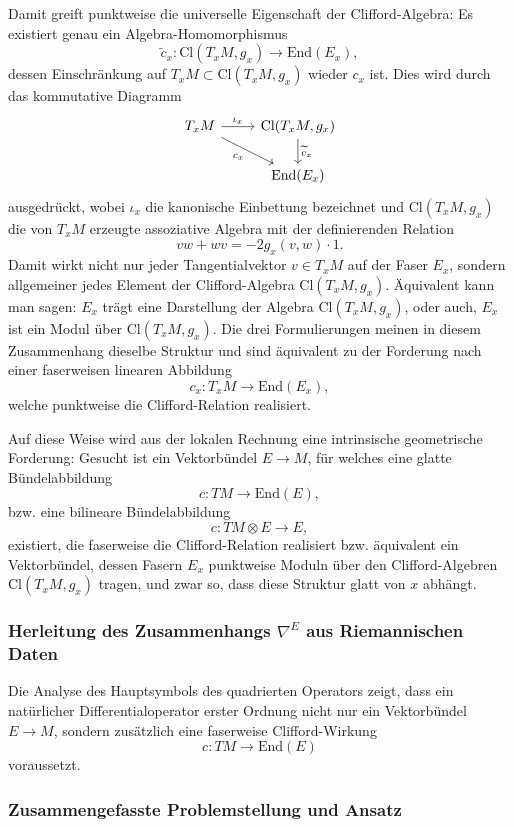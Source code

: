 \documentclass[10pt, letterpaper]{article}
\newcommand{\End}{\mathrm{End}}
\newcommand{\Cl}{\mathrm{Cl}}
\begin{document}
Damit greift punktweise die universelle Eigenschaft der Clifford-Algebra: Es existiert genau ein Algebra-Homomorphismus
\[
\widetilde c_x:\Cl(T_xM,g_x)\longrightarrow \End(E_x),
\]
dessen Einschränkung auf \(T_xM\subset \Cl(T_xM,g_x)\) wieder \(c_x\) ist. Dies wird durch das kommutative Diagramm
\[
\begin{tikzcd}
T_xM \arrow[r,"\iota_x"] \arrow[dr,"c_x"'] & \Cl(T_xM,g_x) \arrow[d,"\widetilde c_x"] \\
& \End(E_x)
\end{tikzcd}
\]
ausgedrückt, wobei \(\iota_x\) die kanonische Einbettung bezeichnet und $\Cl(T_xM,g_x)$ die von \(T_xM\) erzeugte assoziative Algebra mit der definierenden Relation
\[
vw+w v=-2g_x(v,w)\cdot 1.
\]
Damit wirkt nicht nur jeder Tangentialvektor \(v\in T_xM\) auf der Faser \(E_x\), sondern allgemeiner jedes Element der Clifford-Algebra \(\Cl(T_xM,g_x)\). Äquivalent kann man sagen: \(E_x\) trägt eine Darstellung der Algebra \(\Cl(T_xM,g_x)\), oder auch, \(E_x\) ist ein Modul über \(\Cl(T_xM,g_x)\). Die drei Formulierungen meinen in diesem Zusammenhang dieselbe Struktur und sind äquivalent zu der Forderung nach einer faserweisen linearen Abbildung
\[
c_x:T_xM\longrightarrow \End(E_x),
\]
welche punktweise die Clifford-Relation realisiert.

Auf diese Weise wird aus der lokalen Rechnung eine intrinsische geometrische Forderung: Gesucht ist ein Vektorbündel \(E\to M\), für welches eine glatte Bündelabbildung
\[
c:TM\longrightarrow \End(E),
\]
bzw. eine bilineare Bündelabbildung
\[
c:TM\otimes E\longrightarrow E,
\]
existiert, die faserweise die Clifford-Relation realisiert bzw. äquivalent ein Vektorbündel, dessen Fasern \(E_x\) punktweise Moduln über den Clifford-Algebren \(\Cl(T_xM,g_x)\) tragen, und zwar so, dass diese Struktur glatt von \(x\) abhängt. 


\subsubsection{Herleitung des Zusammenhangs $\nabla^E$ aus Riemannischen Daten}

Die Analyse des Hauptsymbols des quadrierten Operators zeigt, dass ein natürlicher Differentialoperator erster Ordnung nicht nur ein Vektorbündel \(E\to M\), sondern zusätzlich eine faserweise Clifford-Wirkung
\[
c:TM\longrightarrow \End(E)
\]
voraussetzt. 


\subsubsection{Zusammengefasste Problemstellung und Ansatz}
\end{document}
